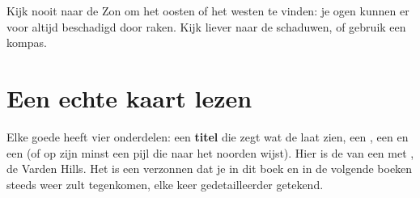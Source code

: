 \begin{safety}
Kijk nooit naar de Zon om het oosten of het westen te vinden: je ogen
kunnen er voor altijd beschadigd door raken. Kijk liever naar de schaduwen,
of gebruik een kompas.
\end{safety}

\section{Een echte kaart lezen}

Elke goede  heeft vier onderdelen: een \textbf{titel} die zegt wat de
 laat zien, een \textbf{}, een \textbf{} en een
\textbf{} (of op zijn minst een pijl die naar het noorden wijst).
Hier is de  van een  met , de Varden Hills. Het is een
verzonnen  dat je in dit boek en in de volgende boeken steeds weer zult
tegenkomen, elke keer gedetailleerder getekend.


